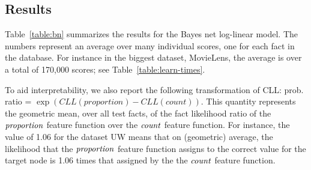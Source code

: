\documentclass[runningheads,a4paper]{llncs}
\begin{document}
\subsection{Results} 

Table~\ref{table:bn} summarizes the results for the Bayes net log-linear model.
The numbers represent an average over many individual scores, one for each fact
in the database. 
For instance in the biggest dataset, MovieLens, the average is over a total of 170,000 scores; see Table~\ref{table:learn-times}. 

To aid interpretability, we also report the following transformation of CLL: prob. ratio = $\exp(CLL(proportion) - CLL( count))$. This quantity represents the geometric mean, over all test facts, of the fact likelihood ratio of the $\it{proportion}$ feature function over the $\it{count}$ feature function.
For instance, the value of 1.06 for the dataset UW means that on (geometric) average, the likelihood that the $\it{proportion}$ feature function assigns to the correct value for the target node is 1.06 times that assigned by the the $\it{count}$ feature function.
\end{document}
